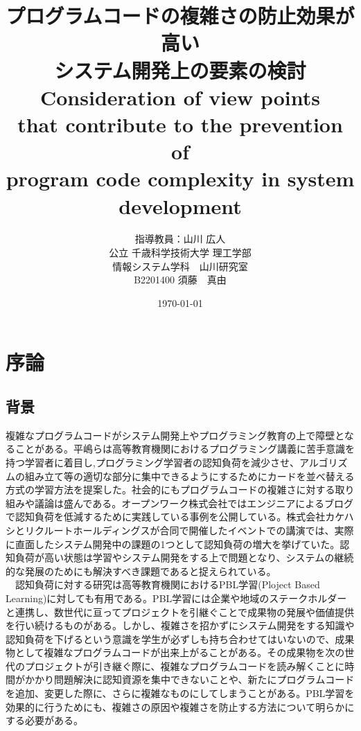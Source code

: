 \documentclass[11pt, a4paper]{jreport}
\begin{document}
    \title{プログラムコードの複雑さの防止効果が高い\\システム開発上の要素の検討\\Consideration of view points\\that contribute to the prevention of\\program code complexity in system development}
    \author{指導教員：山川 広人\\
    公立 千歳科学技術大学 理工学部\\
    情報システム学科　山川研究室\\
B2201400 須藤　真由}
\date{\today}

\maketitle
{}
\tableofcontents
\chapter{序論}

\section{背景}
複雑なプログラムコードがシステム開発上やプログラミング教育の上で障壁となることがある。平嶋ら\cite{haikei}は高等教育機関におけるプログラミング講義に苦手意識を持つ学習者に着目し,プログラミング学習者の認知負荷を減少させ、アルゴリズムの組み立て等の適切な部分に集中できるようにするためにカードを並べ替える方式の学習方法を提案した。社会的にもプログラムコードの複雑さに対する取り組みや議論は盛んである。オープンワーク株式会社ではエンジニアによるブログで認知負荷を低減するために実践している事例を公開している。株式会社カケハシとリクルートホールディングスが合同で開催したイベントでの講演では、実際に直面したシステム開発中の課題の1つとして認知負荷の増大を挙げていた。認知負荷が高い状態は学習やシステム開発をする上で問題となり、システムの継続的な発展のためにも解決すべき課題であると捉えられている。
\\　認知負荷に対する研究は高等教育機関におけるPBL学習(Ploject Based Learning)に対しても有用である。PBL学習には企業や地域のステークホルダーと連携し、数世代に亘ってプロジェクトを引継ぐことで成果物の発展や価値提供を行い続けるものがある。しかし、複雑さを招かずにシステム開発をする知識や認知負荷を下げるという意識を学生が必ずしも持ち合わせてはいないので、成果物として複雑なプログラムコードが出来上がることがある。その成果物を次の世代のプロジェクトが引き継ぐ際に、複雑なプログラムコードを読み解くことに時間がかかり問題解決に認知資源を集中できないことや、新たにプログラムコードを追加、変更した際に、さらに複雑なものにしてしまうことがある。PBL学習を効果的に行うためにも、複雑さの原因や複雑さを防止する方法について明らかにする必要がある。
\end{document}

